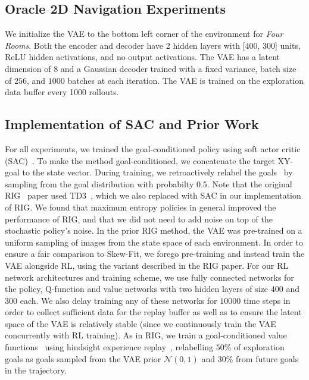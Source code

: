 \subsection{Oracle 2D Navigation Experiments}\label{sec:2d-details}
We initialize the VAE to the bottom left corner of the environment for \textit{Four Rooms}.
Both the encoder and decoder have 2 hidden layers with [400, 300] units,  ReLU hidden activations, and no output activations.
The VAE has a latent dimension of $8$ and a Gaussian decoder trained with a fixed variance, batch size of $256$, and $1000$ batches at each iteration. The VAE is trained on the exploration data buffer every 1000 rollouts.

\subsection{Implementation of SAC and Prior Work}\label{sec:prior-work-implementation}
For all experiments, we trained the goal-conditioned policy using soft actor critic (SAC)~\citep{haarnoja2018sacapp}.
To make the method goal-conditioned, we concatenate the target XY-goal to the state vector.
During training, we retroactively relabel the goals~\citep{kaelbling1993goals,andrychowicz2017her} by sampling from the goal distribution with probabilty $0.5$.
Note that the original RIG~\cite{nair2018rig} paper used TD3~\cite{fujimoto2018td3}, which we also replaced with SAC in our implementation of RIG.
We found that maximum entropy policies in general improved the performance of RIG, and that we did not need to add noise on top of the stochastic policy's noise.
In the prior RIG method, the VAE was pre-trained on a uniform sampling of images from the state space of each environment.
In order to ensure a fair comparison to Skew-Fit, we forego pre-training and instead train the VAE alongside RL, using the variant described in the RIG paper.
For our RL network architectures and training scheme, we use fully connected networks for the policy, Q-function and value networks with two hidden layers of size $400$ and $300$ each.
We also delay training any of these networks for $10000$ time steps in order to collect sufficient data for the replay buffer as well as to ensure the latent space of the VAE is relatively stable (since we continuously train the VAE concurrently with RL training).
As in RIG, we train a goal-conditioned value functions~\cite{schaul2015uva} using hindsight experience replay~\cite{andrychowicz2017her}, relabelling $50\%$ of exploration goals as goals sampled from the VAE prior $\mathcal{N} (0, 1)$ and $30\%$ from future goals in the trajectory.

